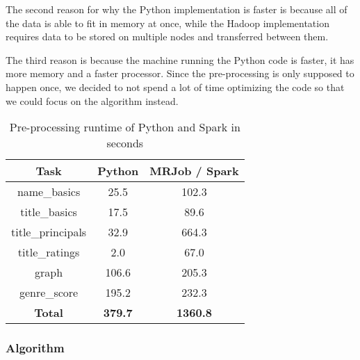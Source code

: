 The second reason for why the Python implementation is faster is because all of the data is able to fit in memory at once, while the Hadoop implementation requires data to be stored on multiple nodes and transferred between them. 

The third reason is because the machine running the Python code is faster, it has more memory and a faster processor. Since the pre-processing is only supposed to happen once, we decided to not spend a lot of time optimizing the code so that we could focus on the algorithm instead.

\begin{table}[H]
\centering
    \begin{tabular}{ |c|c|c| } 
        \hline
        \textbf{Task} & \textbf{Python} & \textbf{MRJob / Spark} \\ 
        \hline
        name\_basics & 25.5 & 102.3 \\ 
        title\_basics & 17.5 & 89.6 \\
        title\_principals & 32.9 & 664.3 \\ 
        title\_ratings & 2.0 & 67.0 \\ 
        graph & 106.6 & 205.3 \\ 
        genre\_score & 195.2 & 232.3 \\ \hline
        \textbf{Total} & \textbf{379.7} & \textbf{1360.8} \\ 
        \hline
    \end{tabular}
    \caption{Pre-processing runtime of Python and Spark in seconds}
    \label{tab:preprocess runtime}
\end{table}

\subsubsection{Algorithm}


